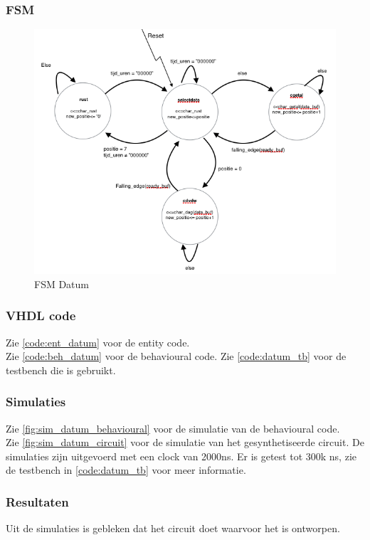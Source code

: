 \subsubsection{FSM}
\begin{figure}
  \centering
     \includegraphics[width=15cm]{verslag_schemas/datum_fsm.png}
       \caption{FSM Datum}
\label{fig:lcddatumfsm}
\end{figure}

\subsubsection{VHDL code}
Zie \ref{code:ent_datum} voor de entity code. \\
Zie \ref{code:beh_datum} voor de behavioural code.
Zie \ref{code:datum_tb} voor de testbench die is gebruikt.
\subsubsection{Simulaties}
Zie \ref{fig:sim_datum_behavioural} voor de simulatie van de behavioural code. \\
Zie \ref{fig:sim_datum_circuit} voor de simulatie van het gesynthetiseerde circuit. 
De simulaties zijn uitgevoerd met een clock van 2000ns.  Er is getest tot 300k ns, zie de testbench in \ref{code:datum_tb} voor meer informatie.

\subsubsection{Resultaten}
Uit de simulaties is gebleken dat het circuit doet waarvoor het is ontworpen.
